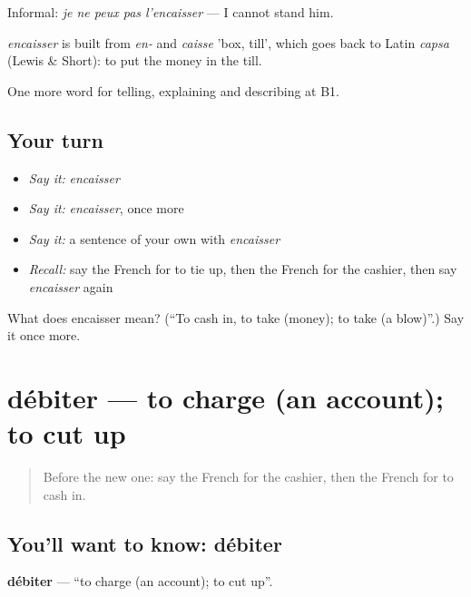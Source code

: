 Informal: \emph{je ne peux pas l'encaisser} — I cannot stand him.

\begin{cousinweb}
\emph{encaisser} is built from \emph{en-} and \emph{caisse} 'box, till', which goes back to Latin \emph{capsa} (Lewis \& Short): to put the money in the till.
\end{cousinweb}

\begin{grammarlens}[title={What you've built}]
One more word for telling, explaining and describing at B1.
\end{grammarlens}

\subsection*{Your turn}
\begin{itemize}
\raggedright
  \item \emph{Say it:} \emph{encaisser}
  \item \emph{Say it:} \emph{encaisser}, once more
  \item \emph{Say it:} a sentence of your own with \emph{encaisser}
  \item \emph{Recall:} say the French for to tie up, then the French for the cashier, then say \emph{encaisser} again
\end{itemize}

\begin{tcolorbox}[breakable,colback=teal!4,colframe=teal!35!black,title={Before you move on}]
What does encaisser mean? (\textquotedblleft{}To cash in, to take (money); to take (a blow)\textquotedblright{}.) Say it once more.
\end{tcolorbox}
\section[débiter]{débiter — to charge (an account); to cut up}

\label{lesson:FR-C450-debiter}



\begin{quote}
Before the new one: say the French for the cashier, then the French for to cash in.
\end{quote}

\subsection*{You'll want to know: débiter}
\textbf{débiter} — \textquotedblleft{}to charge (an account); to cut up\textquotedblright{}.

